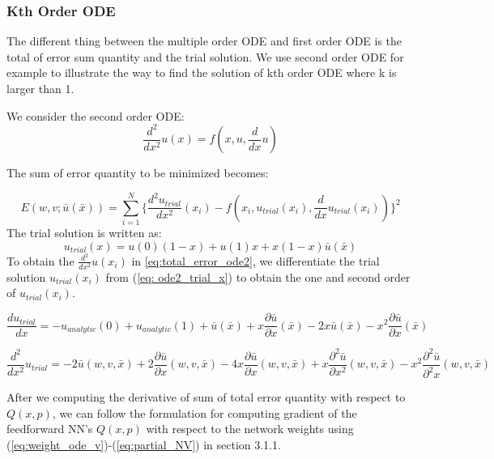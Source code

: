 \documentclass{article}
\begin{document}
\subsubsection{Kth Order ODE}

 The different thing between the multiple order ODE and first order ODE is the total of error sum quantity and the trial solution.  We use second order ODE for example to illustrate the way to find the solution of kth order ODE where k is larger than 1.

\medspace \noindent
We consider the second order ODE:
\[\frac{d^2}{dx^2}u(x)=f(x,u,\frac{d}{dx}u)\]

\medspace \noindent
The sum of error quantity to be minimized becomes:

\begin{equation}\label{eq:total_error_ode2}
E(w,v;\bar{u}(\bar{x})) =\sum_{i=1}^{N} \{ \frac{d^{2} u_{trial}}{dx^2}(x_i)-f(x_{i}, u_{trial}(x_i), \frac{d}{dx}u_{trial}(x_i)) \}^{2}
\end{equation}
\medspace \noindent
The trial solution is written as:
\begin{equation}\label{eq: ode2_trial_x}
u_{trial}(x) = u(0)(1-x)+ u(1)x+x(1-x)\bar{u}(\bar{x})
\end{equation}
\medspace \noindent
To obtain the $\frac{d^2}{dx^2}u(x_i)$ in \ref{eq:total_error_ode2}, we differentiate the trial solution $u_{trial}(x_i)$ from (\ref{eq: ode2_trial_x}) to obtain the one and second order of $u_{trial}(x_i)$.

\begin{equation} \label{eq:ode2_trial_dx}
\frac{d u_{trial}}{dx} = -u_{analytic}(0) + u_{analytic}(1) + \bar{u}(\bar{x}) +x\frac{\partial \bar{u}}{\partial x}(\bar{x}) - 2x\bar{u}(\bar{x}) - x^{2}\frac{\partial \bar{u}}{\partial x}(\bar{x})
\end{equation}

\begin{equation} \label{eq:ode2_trial_dxx}
\frac{d^{2}}{dx^{2}}u_{trial}  = -2\bar{u}(w,v,\bar{x}) + 2\frac{\partial \bar{u} }{\partial x}(w,v,\bar{x}) -4x\frac{\partial \bar{u}}{\partial x}(w,v,\bar{x}) + x\frac{\partial^{2} \bar{u}}{\partial x^{2}}(w,v,\bar{x}) - x^{2}\frac{\partial^{2}  \bar{u}}{\partial^{2} x}(w,v,\bar{x})
\end{equation}

After we computing the derivative of sum of total error quantity with respect to $Q(x,p)$, we can follow the formulation for computing gradient of the feedforward NN's $Q(x,p)$ with respect to the network weights using (\ref{eq:weight_ode_v})-(\ref{eq:partial_NV}) in section 3.1.1.
\end{document}
